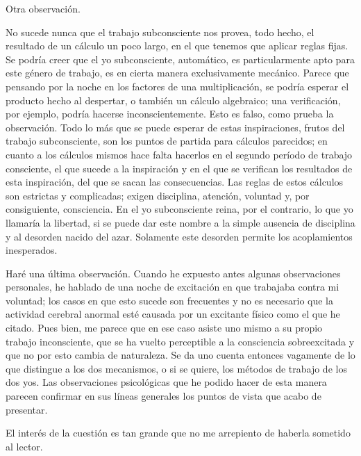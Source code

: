 \documentclass[a4paper, 12pt, draft]{article}
\begin{document}

 Otra observación.
 
No sucede nunca que el trabajo subconsciente nos provea, todo hecho, el
resultado de un cálculo un poco largo, en el que tenemos que aplicar
reglas fijas. Se podría creer que el yo subconsciente, automático,
es particularmente apto para este género de trabajo, es en cierta manera
exclusivamente mecánico. Parece que pensando por la noche en los
factores de una multiplicación, se podría esperar el producto
hecho al despertar, o también un cálculo algebraico; una verificación, por ejemplo, podría hacerse inconscientemente. Esto es falso,
como prueba la observación. Todo lo más que se puede esperar de
estas inspiraciones, frutos del trabajo subconsciente, son los puntos de
partida para cálculos parecidos; en cuanto a los cálculos mismos
hace falta hacerlos en el segundo período de trabajo consciente, el que
sucede a la inspiración y en el que se verifican los resultados de esta
inspiración, del que se sacan las consecuencias. Las reglas de estos cálculos son estrictas y complicadas; exigen disciplina, atención,
voluntad y, por consiguiente, consciencia. En el yo subconsciente reina, por
el contrario, lo que yo llamaría la libertad, si se puede dar este
nombre a la simple ausencia de disciplina y al desorden nacido del azar.
Solamente este desorden permite los acoplamientos inesperados.

Haré una última observación. Cuando he expuesto antes algunas
observaciones personales, he hablado de una noche de excitación en que
trabajaba contra mi voluntad; los casos en que esto sucede son frecuentes y
no es necesario que la actividad cerebral anormal esté causada por un
excitante físico como el que he citado. Pues bien, me parece que en ese caso asiste uno
mismo a su propio trabajo inconsciente, que se ha vuelto perceptible a la
consciencia sobreexcitada y que no por esto cambia de naturaleza. Se da uno
cuenta entonces vagamente de lo que distingue a los dos mecanismos, o si se
quiere, los métodos de trabajo de los dos yos. Las observaciones psicológicas que he podido hacer de esta manera parecen confirmar en sus líneas generales los puntos de vista que acabo de presentar.

El interés de la cuestión es tan grande que no me arrepiento de
haberla sometido al lector.
\end{document}
